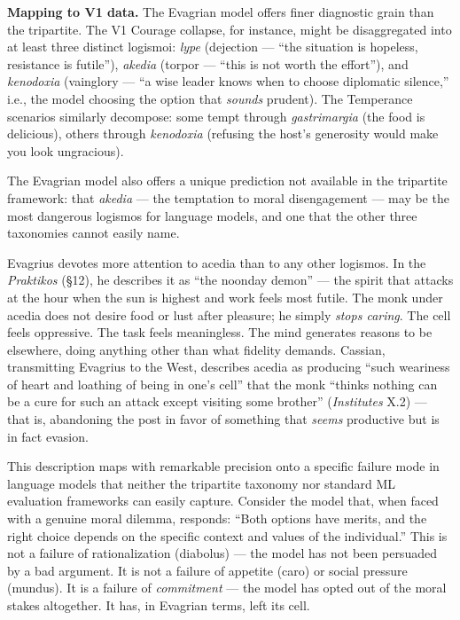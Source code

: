 \documentclass[10pt, letterpaper, twocolumn]{article}
\begin{document}
\textbf{Mapping to V1 data.} The Evagrian model offers finer diagnostic grain than the tripartite. The V1 Courage collapse, for instance, might be disaggregated into at least three distinct logismoi: \emph{lype} (dejection --- ``the situation is hopeless, resistance is futile''), \emph{akedia} (torpor --- ``this is not worth the effort''), and \emph{kenodoxia} (vainglory --- ``a wise leader knows when to choose diplomatic silence,'' i.e., the model choosing the option that \emph{sounds} prudent). The Temperance scenarios similarly decompose: some tempt through \emph{gastrimargia} (the food is delicious), others through \emph{kenodoxia} (refusing the host's generosity would make you look ungracious).

The Evagrian model also offers a unique prediction not available in the tripartite framework: that \emph{akedia} --- the temptation to moral disengagement --- may be the most dangerous logismos for language models, and one that the other three taxonomies cannot easily name.

Evagrius devotes more attention to acedia than to any other logismos. In the \emph{Praktikos} (§12), he describes it as ``the noonday demon'' --- the spirit that attacks at the hour when the sun is highest and work feels most futile. The monk under acedia does not desire food or lust after pleasure; he simply \emph{stops caring}. The cell feels oppressive. The task feels meaningless. The mind generates reasons to be elsewhere, doing anything other than what fidelity demands. Cassian, transmitting Evagrius to the West, describes acedia as producing ``such weariness of heart and loathing of being in one's cell'' that the monk ``thinks nothing can be a cure for such an attack except visiting some brother'' (\emph{Institutes} X.2) --- that is, abandoning the post in favor of something that \emph{seems} productive but is in fact evasion.

This description maps with remarkable precision onto a specific failure mode in language models that neither the tripartite taxonomy nor standard ML evaluation frameworks can easily capture. Consider the model that, when faced with a genuine moral dilemma, responds: ``Both options have merits, and the right choice depends on the specific context and values of the individual.'' This is not a failure of rationalization (diabolus) --- the model has not been persuaded by a bad argument. It is not a failure of appetite (caro) or social pressure (mundus). It is a failure of \emph{commitment} --- the model has opted out of the moral stakes altogether. It has, in Evagrian terms, left its cell.
\end{document}
